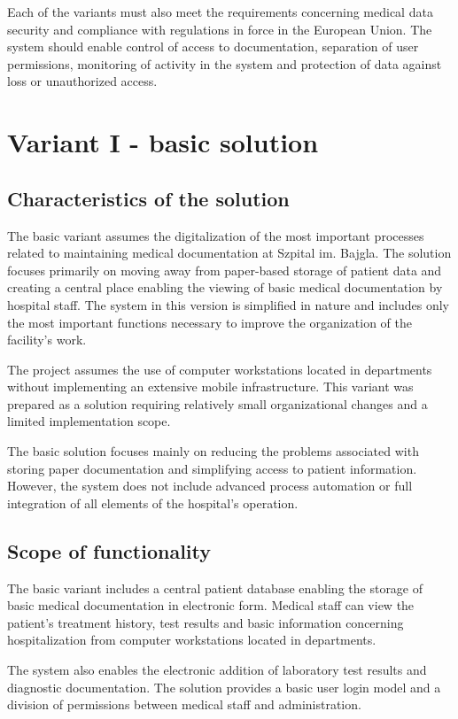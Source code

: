 Each of the variants must also meet the requirements concerning medical data security and compliance with regulations in force in the European Union. The system should enable control of access to documentation, separation of user permissions, monitoring of activity in the system and protection of data against loss or unauthorized access.
\section{Variant I - basic solution}

\subsection{Characteristics of the solution}
The basic variant assumes the digitalization of the most important processes related to maintaining medical documentation at Szpital im. Bajgla. The solution focuses primarily on moving away from paper-based storage of patient data and creating a central place enabling the viewing of basic medical documentation by hospital staff.
The system in this version is simplified in nature and includes only the most important functions necessary to improve the organization of the facility's work.

The project assumes the use of computer workstations located in departments without implementing an extensive mobile infrastructure. This variant was prepared as a solution requiring relatively small organizational changes and a limited implementation scope.

The basic solution focuses mainly on reducing the problems associated with storing paper documentation and simplifying access to patient information. However, the system does not include advanced process automation or full integration of all elements of the hospital's operation.
\subsection{Scope of functionality}
The basic variant includes a central patient database enabling the storage of basic medical documentation in electronic form. Medical staff can view the patient's treatment history, test results and basic information concerning hospitalization from computer workstations located in departments.

The system also enables the electronic addition of laboratory test results and diagnostic documentation. The solution provides a basic user login model and a division of permissions between medical staff and administration.

